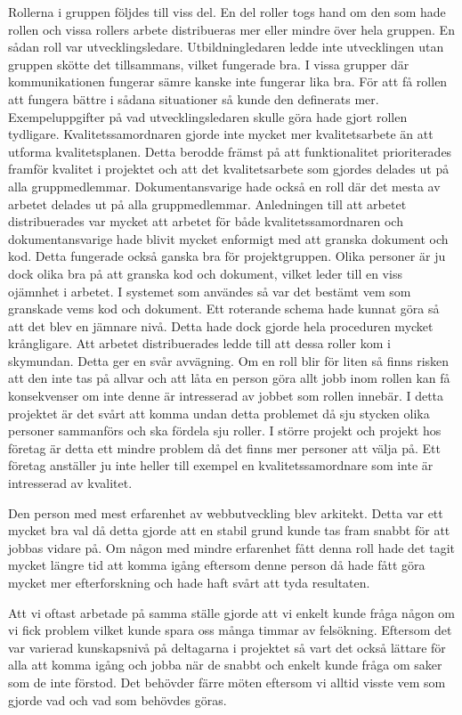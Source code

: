\documentclass{article}
\begin{document}
Rollerna i gruppen följdes till viss del. En del roller togs hand om den som hade rollen och vissa rollers arbete distribueras mer eller mindre över hela gruppen. En sådan roll var utvecklingsledare. Utbildningledaren ledde inte utvecklingen utan gruppen skötte det tillsammans, vilket fungerade bra. I vissa grupper där kommunikationen fungerar sämre kanske inte fungerar lika bra. För att få rollen att fungera bättre i sådana situationer så kunde den definerats mer. Exempeluppgifter på vad utvecklingsledaren skulle göra hade gjort rollen tydligare. Kvalitetssamordnaren gjorde inte mycket mer kvalitetsarbete än att utforma kvalitetsplanen. Detta berodde främst på att funktionalitet prioriterades framför kvalitet i projektet och att det kvalitetsarbete som gjordes delades ut på alla gruppmedlemmar. Dokumentansvarige hade också en roll där det mesta av arbetet delades ut på alla gruppmedlemmar. Anledningen till att arbetet distribuerades var mycket att arbetet för både kvalitetssamordnaren och dokumentansvarige hade blivit mycket enformigt med att granska dokument och kod. Detta fungerade också ganska bra för projektgruppen. Olika personer är ju dock olika bra på att granska kod och dokument, vilket leder till en viss ojämnhet i arbetet. I systemet som användes så var det bestämt vem som granskade vems kod och dokument. Ett roterande schema hade kunnat göra så att det blev en jämnare nivå. Detta hade dock gjorde hela proceduren mycket krångligare. Att arbetet distribuerades ledde till att dessa roller kom i skymundan. Detta ger en svår avvägning. Om en roll blir för liten så finns risken att den inte tas på allvar och att låta en person göra allt jobb inom rollen kan få konsekvenser om inte denne är intresserad av jobbet som rollen innebär. I detta projektet är det svårt att komma undan detta problemet då sju stycken olika personer sammanförs och ska fördela sju roller. I större projekt och projekt hos företag är detta ett mindre problem då det finns mer personer att välja på. Ett företag anställer ju inte heller till exempel en kvalitetssamordnare som inte är intresserad av kvalitet.

Den person med mest erfarenhet av webbutveckling blev arkitekt. Detta var ett mycket bra val då detta gjorde att en stabil grund kunde tas fram snabbt för att jobbas vidare på. Om någon med mindre erfarenhet fått denna roll hade det tagit mycket längre tid att komma igång eftersom denne person då hade fått göra mycket mer efterforskning och hade haft svårt att tyda resultaten. 

Att vi oftast arbetade på samma ställe gjorde att vi enkelt kunde fråga någon om vi fick problem vilket kunde spara oss många timmar av felsökning. Eftersom det var varierad kunskapsnivå på deltagarna i projektet så vart det också lättare för alla att komma igång och jobba när de snabbt och enkelt kunde fråga om saker som de inte förstod. Det behövder färre möten eftersom vi alltid visste vem som gjorde vad och vad som behövdes göras.
\end{document}
